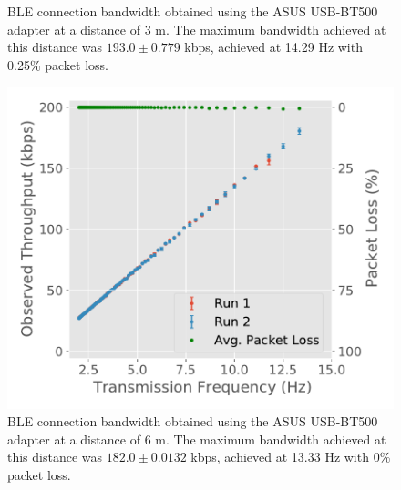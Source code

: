 \begin{figure}[H]
\begin{minipage}{0.45\linewidth}
        \caption[\acs{BLE} connection bandwidth obtained using the ASUS USB-BT500 adapter at a distance of 3 m.]{\acs{BLE} connection bandwidth obtained using the ASUS USB-BT500 adapter at a distance of $3\text{ m}$. The maximum bandwidth achieved at this distance was $193.0 \pm 0.779$ kbps, achieved at 14.29 Hz with 0.25\% packet loss.}
        \label{fig:ble-bandwidth-hci0-3m}
    \end{minipage}
\end{figure}

\begin{figure}[H]
    \centering
    \begin{minipage}{0.45\linewidth}
        \centering
        \includegraphics[width=\linewidth]{images/ble-bandwidth-hci0-600cm.pdf}
        \caption[\acs{BLE} connection bandwidth obtained using the ASUS USB-BT500 adapter at a distance of 6 m.]{\acs{BLE} connection bandwidth obtained using the ASUS USB-BT500 adapter at a distance of $6\text{ m}$. The maximum bandwidth achieved at this distance was $182.0 \pm 0.0132$ kbps, achieved at 13.33 Hz with 0\% packet loss.}
        \label{fig:ble-bandwidth-hci0-6m}
    \end{minipage}
    \hspace{0.05\linewidth}
    \begin{minipage}{0.45\linewidth}
        \centering

\end{minipage}
\end{figure}
